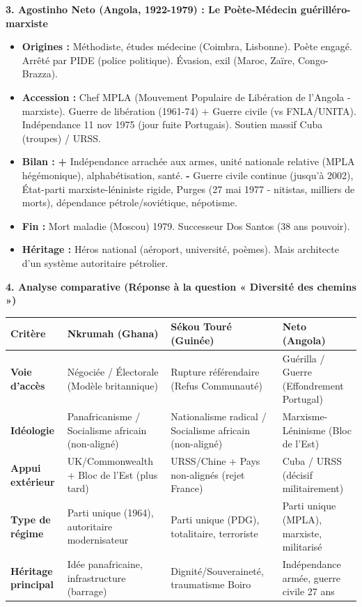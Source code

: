 \documentclass[11pt]{article}
\newcommand{\cle}[1]{{\popxbold\color{popdark}#1}}
\begin{document}
\begin{exoresolu}
\textbf{3. Agostinho Neto (Angola, 1922-1979) : Le Poète-Médecin guérilléro-marxiste}
\begin{itemize}
    \item \textbf{Origines :} Méthodiste, études médecine (Coimbra, Lisbonne). Poète engagé. Arrêté par PIDE (police politique). Évasion, exil (Maroc, Zaïre, Congo-Brazza).
    \item \textbf{Accession :} Chef \cle{MPLA} (Mouvement Populaire de Libération de l'Angola - marxiste). Guerre de libération (1961-74) + Guerre civile (vs FNLA/UNITA). Indépendance 11 nov 1975 (jour fuite Portugais). Soutien massif \cle{Cuba} (troupes) / \cle{URSS}.
    \item \textbf{Bilan :} \textbf{+} Indépendance arrachée aux armes, unité nationale relative (MPLA hégémonique), alphabétisation, santé. \textbf{-} \cle{Guerre civile continue} (jusqu'à 2002), \cle{État-parti marxiste-léniniste} rigide, \cle{Purges} (27 mai 1977 - nitistas, milliers de morts), dépendance pétrole/soviétique, népotisme.
    \item \textbf{Fin :} Mort maladie (Moscou) 1979. Successeur Dos Santos (38 ans pouvoir).
    \item \textbf{Héritage :} Héros national (aéroport, université, poèmes). Mais architecte d'un système autoritaire pétrolier.
\end{itemize}

\textbf{4. Analyse comparative (Réponse à la question « Diversité des chemins »)}
\begin{center}
\begin{tabularx}{\linewidth}{|l|X|X|X|}\hline
\rowcolor{popblueL}
\textbf{Critère} & \textbf{Nkrumah (Ghana)} & \textbf{Sékou Touré (Guinée)} & \textbf{Neto (Angola)} \\ \hline
\textbf{Voie d'accès} & \cle{Négociée / Électorale} (Modèle britannique) & \cle{Rupture référendaire} (Refus Communauté) & \cle{Guérilla / Guerre} (Effondrement Portugal) \\ \hline
\textbf{Idéologie} & \cle{Panafricanisme} / Socialisme africain (non-aligné) & \cle{Nationalisme radical} / Socialisme africain (non-aligné) & \cle{Marxisme-Léninisme} (Bloc de l'Est) \\ \hline
\textbf{Appui extérieur} & UK/Commonwealth + Bloc de l'Est (plus tard) & URSS/Chine + Pays non-alignés (rejet France) & \cle{Cuba / URSS} (décisif militairement) \\ \hline
\textbf{Type de régime} & Parti unique (1964), autoritaire modernisateur & Parti unique (PDG), totalitaire, terroriste & Parti unique (MPLA), marxiste, militarisé \\ \hline
\textbf{Héritage principal} & Idée panafricaine, infrastructure (barrage) & Dignité/Souveraineté, traumatisme Boiro & Indépendance armée, guerre civile 27 ans \\ \hline
\end{tabularx}
\end{center}


\end{exoresolu}
\end{document}
